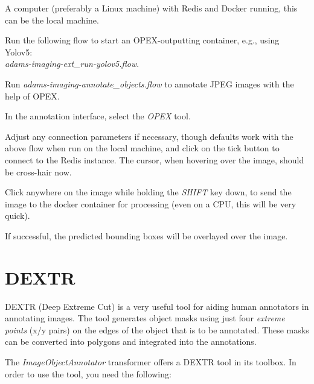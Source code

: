 \documentclass[a4paper]{book}
\begin{document}
\begin{tight_itemize}
  \item A computer (preferably a Linux machine) with Redis\cite{redis} and Docker\cite{docker} running,
  this can be the local machine.
  \item Run the following flow to start an OPEX-outputting container, e.g., using Yolov5: \\
  \textit{adams-imaging-ext\_run-yolov5.flow}.
  \item Run \textit{adams-imaging-annotate\_objects.flow} to annotate JPEG images with the help of OPEX.
  \begin{tight_itemize}
    \item In the annotation interface, select the \textit{OPEX} tool.
    \item Adjust any connection parameters if necessary, though defaults work with the above flow when run on the
    local machine, and click on the tick button to connect to the Redis instance. The cursor, when hovering over
    the image, should be cross-hair now.
    \item Click anywhere on the image while holding the \textit{SHIFT} key down, to send the image to the docker
    container for processing (even on a CPU, this will be very quick).
    \item If successful, the predicted bounding boxes will be overlayed over the image.
  \end{tight_itemize}
\end{tight_itemize}


\section{DEXTR}
DEXTR\cite{dextr} (Deep Extreme Cut) is a very useful tool for aiding human annotators in
annotating images. The tool generates object masks using just four \textit{extreme points}
(x/y pairs) on the edges of the object that is to be annotated. These masks can be converted into polygons
and integrated into the annotations.

The \textit{ImageObjectAnnotator} transformer offers a DEXTR tool in its toolbox. In order
to use the tool, you need the following:
\end{document}
